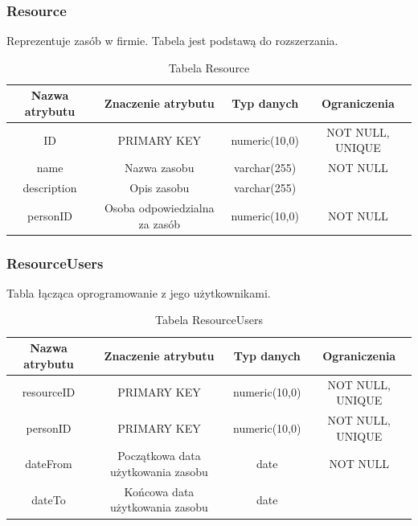 \subsubsection{Resource}
Reprezentuje zasób w firmie. Tabela jest podstawą do rozszerzania.
\begin{table}[H]
	\renewcommand\arraystretch{1.5}
	\renewcommand\tabcolsep{3pt}
	\begin{tabular}{| c | c | c | c |} 
		\hline \textbf{Nazwa atrybutu} & \textbf{Znaczenie atrybutu} & \textbf{Typ danych} & \textbf{Ograniczenia} \\ 
		\hline ID & PRIMARY KEY & numeric(10,0) & NOT NULL, UNIQUE \\ 
		\hline name & Nazwa zasobu & varchar(255) & NOT NULL  \\
		\hline description & Opis zasobu & varchar(255) & \\ 
		\hline personID & Osoba odpowiedzialna za zasób & numeric(10,0) & NOT NULL \\ 
		\hline 
	\end{tabular} 
	\caption{Tabela Resource}
	\label{TAB:Resource}
\end{table}

\subsubsection{ResourceUsers}
Tabla łącząca oprogramowanie z jego użytkownikami.
\begin{table}[H]
	\renewcommand\arraystretch{1.5}
	\renewcommand\tabcolsep{3pt}
	\begin{tabular}{| c | c | c | c |} 
		\hline \textbf{Nazwa atrybutu} & \textbf{Znaczenie atrybutu} & \textbf{Typ danych} & \textbf{Ograniczenia} \\ 
		\hline resourceID & PRIMARY KEY & numeric(10,0) & NOT NULL, UNIQUE \\ 
		\hline personID & PRIMARY KEY & numeric(10,0) & NOT NULL, UNIQUE \\
		\hline dateFrom & Początkowa data użytkowania zasobu & date & NOT NULL \\ 
		\hline dateTo & Końcowa data użytkowania zasobu & date & \\ 
		\hline 
	\end{tabular} 
	\caption{Tabela ResourceUsers}
	\label{TAB:Resource}
\end{table}

